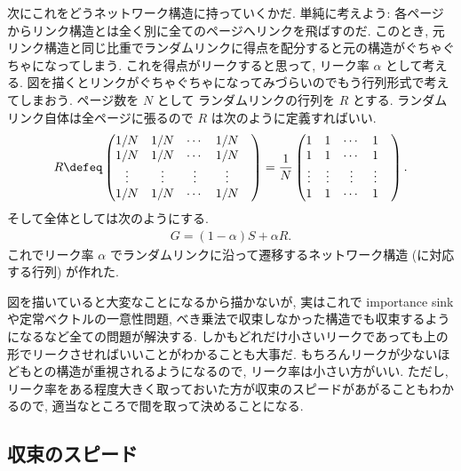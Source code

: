 \documentclass[openany, a4paper, oneside]{jsbook}
\begin{document}
次にこれをどうネットワーク構造に持っていくかだ.
単純に考えよう: 各ページからリンク構造とは全く別に全てのページへリンクを飛ばすのだ.
このとき, 元リンク構造と同じ比重でランダムリンクに得点を配分すると元の構造がぐちゃぐちゃになってしまう.
これを得点がリークすると思って, リーク率 $\alpha$ として考える.
図を描くとリンクがぐちゃぐちゃになってみづらいのでもう行列形式で考えてしまおう.
ページ数を $N$ として ランダムリンクの行列を $R$ とする.
ランダムリンク自体は全ページに張るので $R$ は次のように定義すればいい.
\begin{align}
 R
 \defeq
 \begin{pmatrix}
  1/N & 1/N & \cdots & 1/N \\
  1/N & 1/N & \cdots & 1/N \\
  \vdots & \vdots & \vdots & \vdots & \\
  1/N & 1/N & \cdots & 1/N
 \end{pmatrix}
 =
 \frac{1}{N}
 \begin{pmatrix}
  1 & 1 & \cdots & 1 \\
  1 & 1 & \cdots & 1 \\
  \vdots & \vdots & \vdots & \vdots & \\
  1 & 1 & \cdots & 1
 \end{pmatrix}.
\end{align}
そして全体としては次のようにする.
\begin{align}
 G
 =
 (1 - \alpha) S + \alpha R.
\end{align}
これでリーク率 $\alpha$ でランダムリンクに沿って遷移するネットワーク構造 (に対応する行列) が作れた.

図を描いていると大変なことになるから描かないが,
実はこれで importance sink や定常ベクトルの一意性問題,
べき乗法で収束しなかった構造でも収束するようになるなど全ての問題が解決する.
しかもどれだけ小さいリークであっても上の形でリークさせればいいことがわかることも大事だ.
もちろんリークが少ないほどもとの構造が重視されるようになるので,
リーク率は小さい方がいい.
ただし, リーク率をある程度大きく取っておいた方が収束のスピードがあがることもわかるので,
適当なところで間を取って決めることになる.
\subsection{収束のスピード}
\end{document}

